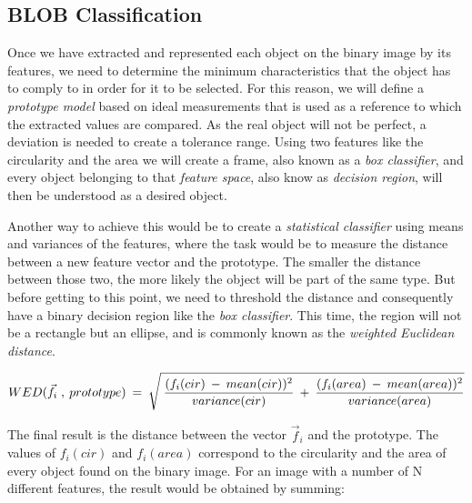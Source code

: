 
\subsection{BLOB Classification}

Once we have extracted and represented each object on the binary image by its features, we need to determine the minimum characteristics that the object has to comply to in order for it to be selected.
For this reason, we will define a \textit{prototype model} based on ideal measurements that is used as a reference to which the extracted values are compared. As the real object will not be perfect, a deviation is needed to create a tolerance range.
Using two features like the circularity and the area we will create a frame, also known as a \textit{box classifier}, and every object belonging to that \textit{feature space}, also know as \textit{decision region}, will then be understood as a desired object.

Another way to achieve this would be to create a \textit{statistical classifier} using means and variances of the features, where the task would be to measure the distance between a new feature vector and the prototype. The smaller the distance between those two, the more likely the object will be part of the same type. But before getting to this point, we need to threshold the distance and consequently have a binary decision region like the \textit{box classifier}.
This time, the region will not be a rectangle but an ellipse, and is commonly known as the \textit{weighted Euclidean distance}.

\begin{equation}	
	\begin{aligned}
{WED(\vec{f}_{i} \; , \: prototype)} \: = \: \sqrt{\mathstrut \:  \displaystyle\frac{(f_{i}(cir) \: - \: mean(cir))^2}{variance(cir)} \: + \: \displaystyle\frac{(f_{i}(area) \: - \: mean(area))^2}{variance(area)}}
\label{Euclidean}
	\end{aligned}
\end{equation}

The final result is the distance between the vector {$\vec{f}_{i}$} and the prototype. The values of {$f_{i}(cir)$} and {$f_{i}(area)$} correspond to the circularity and the area of every object found on the binary image. For an image with a number of N different features, the result would be obtained by summing:


